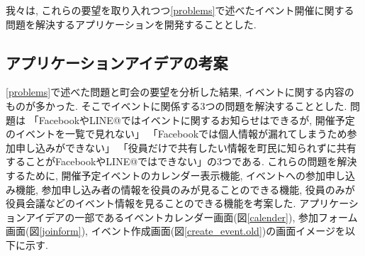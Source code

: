 我々は, これらの要望を取り入れつつ\ref{problems}で述べたイベント開催に関する問題を解決するアプリケーションを開発することとした.


\subsection{アプリケーションアイデアの考案}
\ref{problems}で述べた問題と町会の要望を分析した結果, イベントに関する内容のものが多かった.
そこでイベントに関係する3つの問題を解決することとした. 問題は
「FacebookやLINE@ではイベントに関するお知らせはできるが, 開催予定のイベントを一覧で見れない」
「Facebookでは個人情報が漏れてしまうため参加申し込みができない」
「役員だけで共有したい情報を町民に知られずに共有することがFacebookやLINE@ではできない」の3つである.
これらの問題を解決するために, 開催予定イベントのカレンダー表示機能,
イベントへの参加申し込み機能, 参加申し込み者の情報を役員のみが見ることのできる機能,
役員のみが役員会議などのイベント情報を見ることのできる機能を考案した.
アプリケーションアイデアの一部であるイベントカレンダー画面(図\ref{calender}),
参加フォーム画面(図\ref{joinform}), イベント作成画面(図\ref{create_event.old})の画面イメージを以下に示す.

